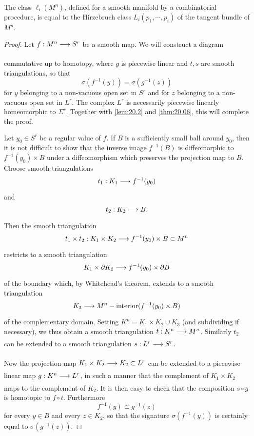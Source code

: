 \documentclass[../main]{subfiles}
\begin{document}
\begin{theorem}
\label{thm:20.07}
The class $\ell_i(M^n)$, defined for a smooth manifold by a combinatorial procedure, is equal to the Hirzebruch class $L_i(p_1,\cdots,p_i)$ of the tangent bundle of $M^n$.
\end{theorem}
\begin{proof}
Let $f:M^n \varrightarrow{} S^r$ be a smooth map. We will construct a diagram
\begin{center}
\end{center}
commutative up to homotopy, where $g$ is piecewise linear and $t,s$ are smooth triangulations, so that \[\sigma(f^{-1}(y)) = \sigma(g^{-1}(z))\] for $y$ belonging to a non-vacuous open set in $S^r$ and for $z$ belonging to a non-vacuous open set in $L^r$. The complex $L^r$ is necessarily piecewise linearly homeomorphic to $\Sigma^r$. Together with \ref{lem:20.2} and \ref{thm:20.06}, this will complete the proof.

Let $y_0 \in S^r$ be a regular value of $f$. If $B$ is a sufficiently small ball around $y_0$, then it is not difficult to show that the inverse image $f^{-1}(B)$ is diffeomorphic to $f^{-1}(y_0) \times B$ under a diffeomorphism which preserves the projection map to $B$. Choose smooth triangulations \[t_1:K_1 \varrightarrow{} f^{-1}(y_0)\] and \[t_2:K_2 \varrightarrow{} B.\] Then the smooth triangulation \[t_1 \times t_2:K_1 \times K_2 \varrightarrow{} f^{-1}(y_0) \times B \subset M^n\] restricts to a smooth triangulation \[K_1 \times \partial K_2 \varrightarrow{} f^{-1}(y_0) \times \partial B \] of the boundary which, by Whitehead's theorem, extends to a smooth triangulation \[K_3 \varrightarrow{} M^n - \text{interior}(f^{-1}(y_0)\times B)\] of the complementary domain. Setting $K^n = K_1 \times K_2 \cup K_3$ (and subdividing if necessary), we thus obtain a smooth triangulation $t:K^n \varrightarrow{} M^n$. Similarly $t_2$ can be extended to a smooth triangulation $s:L^r \varrightarrow{} S^r$.

Now the projection map $K_1 \times K_2 \varrightarrow{} K_2 \subset L^r$ can be extended to a piecewise linear map $g:K^n \varrightarrow{} L^r$, in such a manner that the complement of $K_1 \times K_2$ maps to the complement of $K_2$. It is then easy to check that the composition $s \circ g$ is homotopic to $f \circ t$. Furthermore \[f^{-1}(y) \cong g^{-1}(z)\] for every $y \in B$ and every $z \in K_2$, so that the signature $\sigma(f^{-1}(y))$ is certainly equal to $\sigma(g^{-1}(z))$.
\end{proof}
\end{document}
